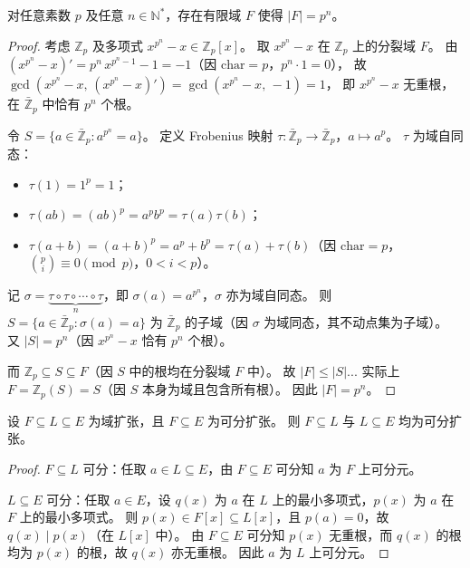 \documentclass[lang=cn,a4paper,newtx]{elegantbook}
\begin{document}
\begin{proposition}
  对任意素数 $p$ 及任意 $n\in\mathbb{N}^*$，存在有限域 $F$ 使得 $|F|=p^n$。
\end{proposition}

\begin{proof}
  考虑 $\mathbb{Z}_p$ 及多项式 $x^{p^n}-x\in\mathbb{Z}_p[x]$。
  取 $x^{p^n}-x$ 在 $\mathbb{Z}_p$ 上的分裂域 $F$。
  由 $(x^{p^n}-x)'=p^n\,x^{p^n-1}-1=-1$（因 $\mathrm{char}=p$，$p^n\cdot 1=0$），
  故 $\gcd(x^{p^n}-x,\,(x^{p^n}-x)')=\gcd(x^{p^n}-x,\,-1)=1$，
  即 $x^{p^n}-x$ 无重根，在 $\bar{\mathbb{Z}}_p$ 中恰有 $p^n$ 个根。

  令 $S=\{a\in\bar{\mathbb{Z}}_p:a^{p^n}=a\}$。
  定义 Frobenius 映射 $\tau\colon\bar{\mathbb{Z}}_p\to\bar{\mathbb{Z}}_p$，$a\mapsto a^p$。
  $\tau$ 为域自同态：
  \begin{itemize}
    \item $\tau(1)=1^p=1$；
    \item $\tau(ab)=(ab)^p=a^p b^p=\tau(a)\tau(b)$；
    \item $\tau(a+b)=(a+b)^p=a^p+b^p=\tau(a)+\tau(b)$（因 $\mathrm{char}=p$，$\binom{p}{i}\equiv 0\pmod{p}$，$0<i<p$）。
  \end{itemize}
  记 $\sigma=\underbrace{\tau\circ\tau\circ\cdots\circ\tau}_{n}$，即 $\sigma(a)=a^{p^n}$，$\sigma$ 亦为域自同态。
  则 $S=\{a\in\bar{\mathbb{Z}}_p:\sigma(a)=a\}$ 为 $\bar{\mathbb{Z}}_p$ 的子域（因 $\sigma$ 为域同态，其不动点集为子域）。
  又 $|S|=p^n$（因 $x^{p^n}-x$ 恰有 $p^n$ 个根）。

  而 $\mathbb{Z}_p\subseteq S\subseteq F$（因 $S$ 中的根均在分裂域 $F$ 中）。
  故 $|F|\le|S|... $ 实际上 $F=\mathbb{Z}_p(S)=S$（因 $S$ 本身为域且包含所有根）。
  因此 $|F|=p^n$。
\end{proof}

\begin{proposition}\label{separable-passes-to-intermediate}
  设 $F\subseteq L\subseteq E$ 为域扩张，且 $F\subseteq E$ 为可分扩张。
  则 $F\subseteq L$ 与 $L\subseteq E$ 均为可分扩张。
\end{proposition}

\begin{proof}
  $F\subseteq L$ 可分：任取 $a\in L\subseteq E$，由 $F\subseteq E$ 可分知 $a$ 为 $F$ 上可分元。

  $L\subseteq E$ 可分：任取 $a\in E$，设 $q(x)$ 为 $a$ 在 $L$ 上的最小多项式，$p(x)$ 为 $a$ 在 $F$ 上的最小多项式。
  则 $p(x)\in F[x]\subseteq L[x]$，且 $p(a)=0$，故 $q(x)\mid p(x)$（在 $L[x]$ 中）。
  由 $F\subseteq E$ 可分知 $p(x)$ 无重根，而 $q(x)$ 的根均为 $p(x)$ 的根，故 $q(x)$ 亦无重根。
  因此 $a$ 为 $L$ 上可分元。
\end{proof}
\end{document}
